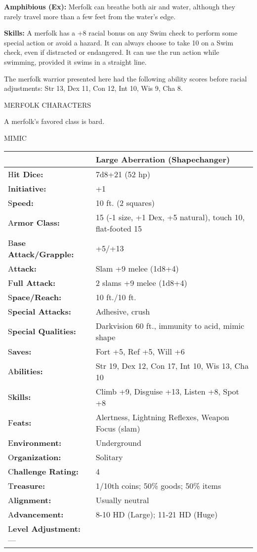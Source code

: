 \documentclass{article}
\begin{document}
\textbf{Amphibious (Ex): }Merfolk can breathe both air and water, although they 
rarely travel more than a few feet from the water's edge. 

\textbf{Skills:} A merfolk has a +8 racial bonus on any Swim check to perform some 
special action or avoid a hazard. It can always choose to take 10 on a Swim check, 
even if distracted or endangered. It can use the run action while swimming, provided 
it swims in a straight line.

The merfolk warrior presented here had the following ability scores before racial 
adjustments: Str 13, Dex 11, Con 12, Int 10, Wis 9, Cha 8.

MERFOLK CHARACTERS

A merfolk's favored class is bard.

\vspace{12pt}
{\LARGE{}MIMIC}

\begin{tabular}{|>{\raggedright}p{91pt}|>{\raggedright}p{226pt}|}
\hline
  & Large Aberration (Shapechanger)\tabularnewline
\hline
H\textbf{it Dice:} & 7d8+21 (52 hp)\tabularnewline
\hline
I\textbf{nitiative:} & +1\tabularnewline
\hline
S\textbf{peed:} & 10 ft. (2 squares)\tabularnewline
\hline
A\textbf{rmor Class:} & 15 (-1 size, +1 Dex, +5 natural), touch 10, flat-footed 
15\tabularnewline
\hline
B\textbf{ase Attack/Grapple:} & +5/+13\tabularnewline
\hline
A\textbf{ttack:} & Slam +9 melee (1d8+4)\tabularnewline
\hline
F\textbf{ull Attack:} & 2 slams +9 melee (1d8+4)\tabularnewline
\hline
S\textbf{pace/Reach:} & 10 ft./10 ft.\tabularnewline
\hline
S\textbf{pecial Attacks:} & Adhesive, crush\tabularnewline
\hline
S\textbf{pecial Qualities:} & Darkvision 60 ft., immunity to acid, mimic shape\tabularnewline
\hline
S\textbf{aves:} & Fort +5, Ref +5, Will +6\tabularnewline
\hline
A\textbf{bilities:} & Str 19, Dex 12, Con 17, Int 10, Wis 13, Cha 10\tabularnewline
\hline
S\textbf{kills:} & Climb +9, Disguise +13, Listen +8, Spot +8\tabularnewline
\hline
F\textbf{eats:} & Alertness, Lightning Reflexes, Weapon Focus (slam)\tabularnewline
\hline
E\textbf{nvironment:} & Underground\tabularnewline
\hline
O\textbf{rganization:} & Solitary\tabularnewline
\hline
C\textbf{hallenge Rating:} & 4\tabularnewline
\hline
T\textbf{reasure:} & 1/10th coins; 50\% goods; 50\% items\tabularnewline
\hline
A\textbf{lignment:} & Usually neutral\tabularnewline
\hline
A\textbf{dvancement:} & 8-10 HD (Large); 11-21 HD (Huge)\tabularnewline
\hline
L\textbf{evel Adjustment:}--- & \tabularnewline
\hline
\end{tabular}
\end{document}

